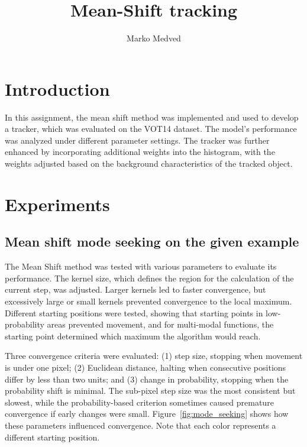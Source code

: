 \documentclass[9pt]{IEEEtran}
\title{\vspace{0ex}
Mean-Shift tracking}
\author{Marko Medved\vspace{-4.0ex}}
\begin{document}
\maketitle

\section{Introduction}
In this assignment, the mean shift method was implemented and used to develop a tracker, which was 
evaluated on the VOT14 dataset. The model's performance was analyzed under different parameter settings. 
The tracker was further enhanced by incorporating additional weights into the histogram, with the weights
 adjusted based on the background characteristics of the tracked object.

\section{Experiments}
\subsection{Mean shift mode seeking on the given example}
The Mean Shift method was tested with various parameters to evaluate its performance. 
The kernel size, which defines the region for the calculation of the current step,
 was adjusted. Larger 
kernels led to faster convergence, but excessively large or small kernels
 prevented convergence to the local maximum. Different starting positions were tested, showing
  that starting points in low-probability areas prevented movement, and for multi-modal 
  functions, the starting point determined which maximum the algorithm would reach.

Three convergence criteria were evaluated: (1) step size, stopping when movement is under 
one pixel; (2) Euclidean distance, halting when consecutive positions differ by less than 
two units; and (3) change in probability, stopping when the probability shift is minimal. 
The sub-pixel step size was the most consistent but slowest, while the probability-based
 criterion sometimes caused premature convergence if early changes were small. 
 Figure~\ref{fig:mode_seeking} shows how these parameters influenced convergence. Note 
 that each color represents a different starting position.
\end{document}
